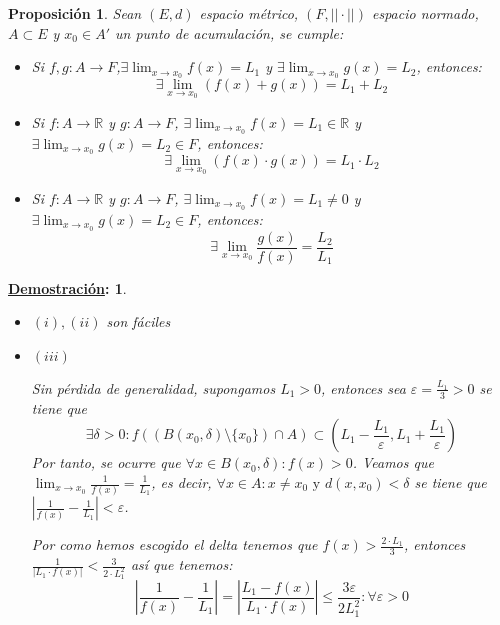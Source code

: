 \documentclass[10pt,a4paper,openright]{book}
\theoremstyle{break}
\newtheorem*{prop}{Proposición}
\newtheorem*{demo}{\underline{Demostración}:}
\begin{document}
\begin{prop}
Sean $(E,d)$ espacio métrico, $(F, || \cdot ||)$ espacio normado, $A \subset E$ y $x_0 \in A'$ un punto de acumulación, se cumple:
\begin{itemize}
\item Si $f,g : A \to F$,$\exists \lim_{x \to x_0} f(x) = L_1$ y $\exists \lim_{x \to x_0} g(x) = L_2$, entonces:
$$\exists \lim_{x \to x_0} (f(x) + g(x)) = L_1 + L_2$$

\item Si $f: A \to \mathbb{R}$ y $g: A \to F$, $\exists \lim_{x \to x_0} f(x) = L_1 \in \mathbb{R}$ y $\exists \lim_{x \to x_0} g(x) = L_2 \in F$, entonces:
$$\exists \lim_{x \to x_0} (f(x) \cdot g(x)) = L_1 \cdot L_2$$

\item Si $f: A \to \mathbb{R}$ y $g: A \to F$, $\exists \lim_{x \to x_0} f(x) = L_1 \neq 0$ y $\exists \lim_{x \to x_0} g(x) = L_2 \in F$, entonces:
$$\exists \lim_{x \to x_0} \frac{g(x)}{f(x)} = \frac{L_2}{L_1}$$
\end{itemize}
\end{prop}
\begin{demo}
\begin{itemize}
\item $(i), (ii)$ son fáciles
\item $(iii)$

Sin pérdida de generalidad, supongamos $L_1 > 0$, entonces sea $\varepsilon = \frac{L_1}{3} > 0$ se tiene que
$$\exists \delta > 0 : f\left((B(x_0, \delta) \setminus \{x_0\}) \cap A\right) \subset \left(L_1 - \frac{L_1}{\varepsilon}, L_1 + \frac{L_1}{\varepsilon}\right)$$
Por tanto, se ocurre que $\forall x \in B(x_0, \delta) : f(x) > 0$. Veamos que $\lim_{x \to x_0} \frac{1}{f(x)} = \frac{1}{L_1}$, es decir, $ \forall x \in A : x \neq x_0 \mbox{ y } d(x, x_0) < \delta$ se tiene que $\left| \frac{1}{f(x)}  - \frac{1}{L_1} \right| < \varepsilon$.

Por como hemos escogido el delta tenemos que $f(x) > \frac{2 \cdot L_1}{3}$, entonces $\frac{1}{|L_1 \cdot f(x)|} < \frac{3}{2 \cdot L_1^2}$ así que tenemos:
$$\left| \frac{1}{f(x)}  - \frac{1}{L_1} \right| = \left| \frac{L_1 - f(x)}{L_1 \cdot f(x)} \right| \leq \frac{3 \varepsilon}{2 L_1^2} : \forall \varepsilon >0$$
\end{itemize}
\end{demo}
\end{document}
